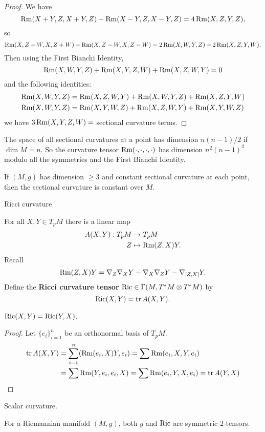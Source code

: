 \begin{proof}
  We have
  \[ \operatorname{Rm}(X+Y,Z,X+Y,Z)-\operatorname{Rm}(X-Y,Z,X-Y,Z) = 4\operatorname{Rm}(X,Z,Y,Z), \]
  so
  \[ \operatorname{Rm}(X,Z+W,X,Z+W)-\operatorname{Rm}(X,Z-W,X,Z-W) = 2\operatorname{Rm}(X,W,Y,Z) + 2\operatorname{Rm}(X,Z,Y,W). \]
  Then using the First Bianchi Identity, 
  \[ \operatorname{Rm}(X,W,Y,Z) + \operatorname{Rm}(X,Y,Z,W) + \operatorname{Rm}(X,Z,W,Y) = 0 \]
  and the following identities:
  \begin{align*}
    \operatorname{Rm}(X,W,Y,Z) &= \operatorname{Rm}(X,Z,W,Y) + \operatorname{Rm}(X,W,Y,Z) + \operatorname{Rm}(X,Z,Y,W) \\
    \operatorname{Rm}(X,W,Y,Z) &= \operatorname{Rm}(X,Y,W,Z) + \operatorname{Rm}(X,Z,W,Y) + \operatorname{Rm}(X,Y,W,Z)
  \end{align*}
  we have $3\operatorname{Rm}(X,Y,Z,W)=$ sectional curvature terms.
\end{proof}

\begin{rmk}
  The space of all sectional curvatures at a point has dimension $n(n-1)/2$ if $\dim M=n$.
  So the curvature tensor $\operatorname{Rm}(\cdot,\cdot,\cdot,\cdot)$ has dimension $n^2(n-1)^2$ modulo all the symmetries and the First Bianchi Identity.
\end{rmk}

\begin{prop}
  If $(M,g)$ has dimension $\geq 3$ and constant sectional curvature at each point, then the sectional curvature is constant over $M$.
\end{prop}

Ricci curvature

\begin{defn}
  For all $X,Y\in T_pM$ there is a linear map
  \begin{align*}
    A(X,Y): T_pM &\to T_pM \\
    Z &\mapsto \operatorname{Rm}(Z,X)Y.
  \end{align*}
  Recall
  \[ \operatorname{Rm}(Z,X)Y = \nabla_Z\nabla_XY-\nabla_X\nabla_ZY-\nabla_{[Z,X]}Y. \]
  Define the \textbf{Ricci curvature tensor} $\operatorname{Ric}\in\Gamma(M,T^*M \otimes T^*M)$ by
  \[ \operatorname{Ric}(X,Y) = \operatorname{tr} A(X,Y). \]
\end{defn}

\begin{prop}
  $\operatorname{Ric}(X,Y) = \operatorname{Ric}(Y,X)$.
\end{prop}

\begin{proof}
  Let $\{e_i\}_{i=1}^n$ be an orthonormal basis of $T_pM$.
  \begin{align*}
    \operatorname{tr} A(X,Y) &= \sum_{i=1}^n (\operatorname{Rm}(e_i,X)Y,e_i) = \sum \operatorname{Rm} (e_i,X,Y,e_i) \\
    &= \sum \operatorname{Rm}(Y,e_i,e_i,X) = \sum \operatorname{Rm}(e_i,Y,X,e_i) = \operatorname{tr} A(Y,X) \qedhere
  \end{align*}
\end{proof}

Scalar curvature.

For a Riemannian manifold $(M,g)$, both $g$ and $\operatorname{Ric}$ are symmetric $2$-tensors.
